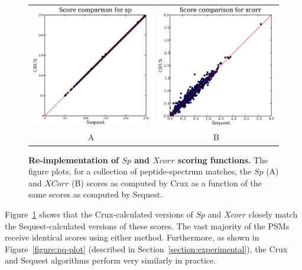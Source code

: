 \documentclass[12pt]{article}
\begin{document}
\begin{figure}
  \centering
  \begin{tabular}{cc}
    \includegraphics[width=3in]{./Images/random-sp.eps} &
    \includegraphics[width=3in]{./Images/random-xcorr.eps} \\
  A & B \\
  \end{tabular}
  \caption{{\bf Re-implementation of $Sp$ and $Xcorr$ scoring functions.}
  The figure plots, for a collection of peptide-spectrum matches, the
  $Sp$ (A) and $XCorr$ (B) scores as computed by Crux as a function of the
  same scores as computed by {\sc Sequest}.
  \label{figure:sp-xcorr}}
\end{figure}

Figure~\ref{figure:sp-xcorr} shows that the Crux-calculated versions
of $Sp$ and $Xcorr$ closely match the {\sc Sequest}-calculated
versions of these scores.  The vast majority of the PSMs receive
identical scores using either method.  Furthermore, as shown in
Figure~\ref{figure:pq-plot} (described in
Section~\ref{section:experimental}), the Crux and {\sc Sequest}
algorithms perform very similarly in practice.
\end{document}
